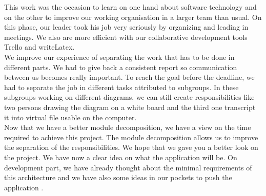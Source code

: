 This work was the occasion to learn on one hand about software technology and on the other to improve our working organisation in a larger team than usual.
On this phase, our leader took his job very seriously by organizing and leading in meetings.
We also are more efficient with our collaborative development tools Trello and writeLatex.\\

We improve our experience of separating the work that has to be done in different parts.
We had to give back a consistent report so communication between us becomes really important.
To reach the goal before the deadline, we had to separate the job in different tasks attributed to subgroups.
In these subgroups working on different diagrams, we can still create responsibilities like two persons drawing the diagram on a white board and the third one transcript it into virtual file usable on the computer.\\

Now that we have a better module decomposition, we have a view on the time required to achieve this project.
The module decomposition allows us to improve the separation of the responsibilities. We hope that we gave you a better look on the project.
We have now a clear idea on what the application will be.
On development part, we have already thought about the minimal requirements of this architecture and we have also some ideas in our pockets to push the application .


